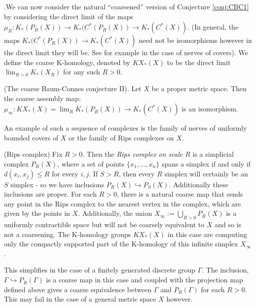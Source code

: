 \begin{conjecture}
.We can now consider the natural ``coarsened'' version of Conjecture \ref{conj:CBC1} by considering the direct limit of the maps $\mu_{R}: K_{*}(P_{R}(X)) \rightarrow K_{*}(C^{*}(P_{R}(X)) \rightarrow K_{*}(C^{*}(X))$. (In general, the maps $K_{*}(C^{*}(P_{R}(X)) \rightarrow K_{*}(C^{*}(X))$ need not be isomorphisms however in the direct limit they will be. See for example \cite[Theorem 2.17]{MR2119281} in the case of nerves of covers). We define the coarse K-homology, denoted by $KX_{*}(X)$ to be the direct limit $\lim_{R>0}K_{*}(X_{R})$ for any such $R>0$.

\begin{conjecture}\label{conj:CBC2}(The coarse Baum-Connes conjecture II).
Let $X$ be a proper metric space. Then the coarse assembly map: $\mu_{\infty}:KX_{*}(X)= \lim_{R}K_{*}(P_{R}(X)) \rightarrow K_{*}(C^{*}(X))$ is an isomorphism. 
\end{conjecture}

An example of such a sequence of complexes is the family of nerves of uniformly bounded covers of $X$ or the family of Rips complexes on $X$.

\begin{example}\label{ex:rips}
(Rips complex) Fix $R>0$. Then the \textit{Rips complex on scale $R$} is a simplicial complex $P_{R}(X)$, where a set of points $\lbrace x_{1},...,x_{n} \rbrace$ spans a simplex if and only if $d(x_{i},x_{j}) \leq R$ for every $i,j$. If $S>R$, then every $R$ simplex will certainly be an $S$ simplex - so we have inclusions $P_{R}(X)\hookrightarrow P_{S}(X)$. Additionally these inclusions are proper. For each $R>0$, there is a natural coarse map that sends any point in the Rips complex to the nearest vertex in the complex, which are given by the points in $X$. Additionally, the union $X_{\infty}:=\bigcup_{R>0}P_{R}(X)$ is a uniformly contractible space but will not be coarsely equivalent to $X$ and so is not a coarsening. The K-homology groups $KX_{*}(X)$ in this case are computing only the compactly supported part of the K-homology of this infinite simplex $X_{\infty}$.
\end{example}

\begin{remark}
This simplifies in the case of a finitely generated discrete group $\Gamma$. The inclusion, $\Gamma \hookrightarrow P_{R}(\Gamma)$ is a coarse map in this case and coupled with the projection map defined above gives a coarse equivalence between $\Gamma$ and $P_{R}(\Gamma)$ for each $R>0$. This may fail in the case of a general metric space $X$ however.
\end{remark}




\end{conjecture}
